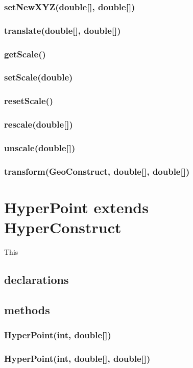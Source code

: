 \documentclass[a4paper,10pt]{report}
\begin{document}
\subsubsection{setNewXYZ(double[], double[])}
\subsubsection{translate(double[], double[])}
\subsubsection{getScale()}
\subsubsection{setScale(double)}
\subsubsection{resetScale()}
\subsubsection{rescale(double[])}
\subsubsection{unscale(double[])}
\subsubsection{transform(GeoConstruct, double[], double[])}
\section{HyperPoint extends HyperConstruct} This
\subsection{declarations}
\subsubsection{}
\subsection{methods}
\subsubsection{HyperPoint(int, double[])}
\subsubsection{HyperPoint(int, double[], double[])}
\end{document}
